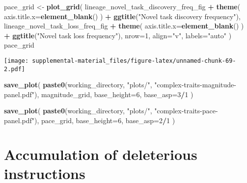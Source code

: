 \documentclass[]{book}
\newenvironment{Shaded}{\begin{snugshade}}{\end{snugshade}}
\newcommand{\DataTypeTok}[1]{\textcolor[rgb]{0.13,0.29,0.53}{#1}}
\newcommand{\DecValTok}[1]{\textcolor[rgb]{0.00,0.00,0.81}{#1}}
\newcommand{\KeywordTok}[1]{\textcolor[rgb]{0.13,0.29,0.53}{\textbf{#1}}}
\newcommand{\NormalTok}[1]{#1}
\newcommand{\OperatorTok}[1]{\textcolor[rgb]{0.81,0.36,0.00}{\textbf{#1}}}
\newcommand{\StringTok}[1]{\textcolor[rgb]{0.31,0.60,0.02}{#1}}
\begin{document}
\begin{Shaded}
\begin{Highlighting}[]
\NormalTok{pace_grid <-}\StringTok{ }\KeywordTok{plot_grid}\NormalTok{(}
\NormalTok{  lineage_novel_task_discovery_freq_fig }\OperatorTok{+}
\StringTok{    }\KeywordTok{theme}\NormalTok{(}
      \DataTypeTok{axis.title.x=}\KeywordTok{element_blank}\NormalTok{()}
\NormalTok{    ) }\OperatorTok{+}
\StringTok{    }\KeywordTok{ggtitle}\NormalTok{(}\StringTok{"Novel task discovery frequency"}\NormalTok{),}
\NormalTok{  lineage_novel_task_loss_freq_fig }\OperatorTok{+}
\StringTok{    }\KeywordTok{theme}\NormalTok{(}
      \DataTypeTok{axis.title.x=}\KeywordTok{element_blank}\NormalTok{()}
\NormalTok{    ) }\OperatorTok{+}
\StringTok{    }\KeywordTok{ggtitle}\NormalTok{(}\StringTok{"Novel task loss frequency"}\NormalTok{),}
  \DataTypeTok{nrow=}\DecValTok{1}\NormalTok{,}
  \DataTypeTok{align=}\StringTok{"v"}\NormalTok{,}
  \DataTypeTok{labels=}\StringTok{"auto"}
\NormalTok{)}
\NormalTok{pace_grid}
\end{Highlighting}
\end{Shaded}

\texttt{[image: supplemental-material\_files/figure-latex/unnamed-chunk-69-2.pdf]}

\begin{Shaded}
\begin{Highlighting}[]
\KeywordTok{save_plot}\NormalTok{(}
   \KeywordTok{paste0}\NormalTok{(working_directory, }\StringTok{"plots/"}\NormalTok{, }\StringTok{"complex-traits-magnitude-panel.pdf"}\NormalTok{),}
\NormalTok{   magnitude_grid,}
   \DataTypeTok{base_height=}\DecValTok{6}\NormalTok{,}
   \DataTypeTok{base_asp=}\DecValTok{3}\OperatorTok{/}\DecValTok{1}
\NormalTok{)}

\KeywordTok{save_plot}\NormalTok{(}
   \KeywordTok{paste0}\NormalTok{(working_directory, }\StringTok{"plots/"}\NormalTok{, }\StringTok{"complex-traits-pace-panel.pdf"}\NormalTok{),}
\NormalTok{   pace_grid,}
   \DataTypeTok{base_height=}\DecValTok{6}\NormalTok{,}
   \DataTypeTok{base_asp=}\DecValTok{2}\OperatorTok{/}\DecValTok{1}
\NormalTok{)}
\end{Highlighting}
\end{Shaded}

\hypertarget{accumulation-of-deleterious-instructions}{%
\chapter{Accumulation of deleterious instructions}\label{accumulation-of-deleterious-instructions}}
\end{document}
